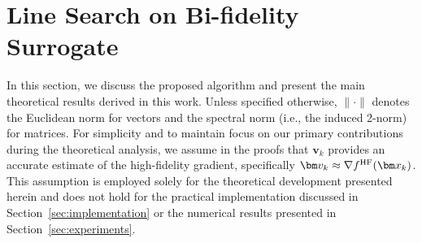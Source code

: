 \documentclass[10pt]{article} %
\numberwithin{equation}{section}
\theoremstyle{plain}
\theoremstyle{definition}
\newcommand{\<}{\langle}
\renewcommand{\>}{\rangle}
\renewcommand{\(}{\left(}
\renewcommand{\)}{\right)}
\renewcommand{\[}{\left[}
\renewcommand{\]}{\right]}
\newcommand{\HF}{\textup{HF}}
\begin{document}

\section{Line Search on Bi-fidelity Surrogate}
\label{sec:bf-ls}

In this section, we discuss the proposed algorithm and present the main theoretical results derived in this work.
Unless specified otherwise, $\lVert\cdot\rVert$ denotes the Euclidean norm for vectors and the spectral norm (i.e., the induced 2-norm) for matrices.
For simplicity and to maintain focus on our primary contributions during the theoretical analysis, we assume in the proofs that $\bm v_k$ provides an accurate estimate of the high-fidelity gradient, specifically $\bm v_k \approx \nabla f^{\HF}(\bm x_k)$.
This assumption is employed solely for the theoretical development presented herein and does not hold for the practical implementation discussed in Section~\ref{sec:implementation} or the numerical results presented in Section~\ref{sec:experiments}.
\end{document}
